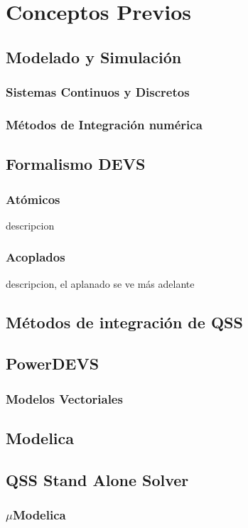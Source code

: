 \documentclass[a4paper,	11pt]{article}
\begin{document}
\section{Conceptos Previos}
\subsection{Modelado y Simulación}
\subsubsection{Sistemas Continuos y Discretos}
\subsubsection{Métodos de Integración numérica}
\subsection{Formalismo DEVS}
\subsubsection{Atómicos }
	descripcion
\subsubsection{Acoplados}
	descripcion, el aplanado se ve más adelante
\subsection {Métodos de integración de QSS}
\subsection {PowerDEVS}
\subsubsection{Modelos Vectoriales}
\subsection{Modelica}
\subsection{QSS Stand Alone Solver}
\subsubsection{$\mu$Modelica}
\end{document}
